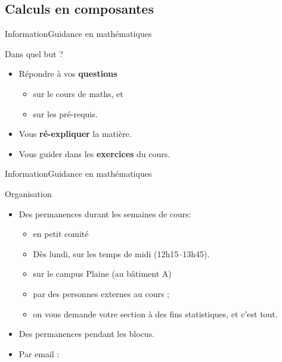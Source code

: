 \documentclass[french,xcolor=svgnames]{beamer}
\begin{document}
\subsection{Calculs en composantes}
\begin{frame}{Information}{Guidance en mathématiques}
  \begin{block}{Dans quel but ?}
    \begin{itemize}
    \item Répondre à vos \textbf{questions}
      \begin{itemize}
      \item sur le cours de maths, et
      \item sur les pré-requis.
      \end{itemize}
    \item Vous \textbf{ré-expliquer} la matière.
    \item Vous guider dans les \textbf{exercices} du cours.
    \end{itemize}
  \end{block}
\end{frame}
\begin{frame}{Information}{Guidance en mathématiques}
  \begin{block}{Organisation}
    \begin{itemize}
    \item Des permanences durant les semaines de cours:
      \begin{itemize}
      \item en petit comité
      \item Dès lundi, sur les temps de midi (12h15--13h45).
      \item sur le campus Plaine (au bâtiment A)
      \item par des personnes externes au cours ;
      \item on vous demande votre section à des fins statistiques, et c'est tout.
      \end{itemize}
    \item Des permanences pendant les blocus.
    \item Par email : 
    \end{itemize}
  \end{block}
\end{frame}
\end{document}
